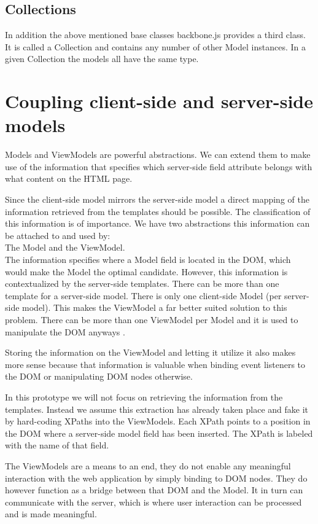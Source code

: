 \subsection{Collections}
In addition the above mentioned base classes backbone.js provides a third class.
It is called a Collection and contains any number of other Model instances.
In a given Collection the models all have the same type.

\section{Coupling client-side and server-side models}
Models and ViewModels are powerful abstractions.
We can extend them to make use of the information that specifies
which server-side field attribute belongs with what content on the HTML page.

Since the client-side model mirrors the server-side model a direct mapping of
the information retrieved from the templates should be possible.
The classification of this information is of importance. We have two
abstractions this information can be attached to and used by:\\
The Model and the ViewModel.\\
The information specifies where a Model field is located in the DOM, which would
make the Model the optimal candidate. However, this information is
contextualized by the server-side templates. There can be more than one template
for a server-side model. There is only one client-side Model
(per server-side model).
This makes the ViewModel a far better suited solution to this problem.
There can be more than one ViewModel per Model and it is used to manipulate the
DOM anyways .

Storing the information on the ViewModel and letting it utilize it also makes
more sense because that information is valuable when binding event listeners
to the DOM or manipulating DOM nodes otherwise.

In this prototype we will not focus on retrieving the information from
the templates. Instead we assume this extraction has already taken place and
fake it by hard-coding XPaths into the ViewModels. Each XPath points to a
position in the DOM where a server-side model field has been inserted.
The XPath is labeled with the name of that field.

The ViewModels are a means to an end, they do not enable any meaningful
interaction with the web application by simply binding to DOM nodes.
They do however function as a bridge between that DOM and the Model.
It in turn can communicate with the server, which is where user interaction
can be processed and is made meaningful.


